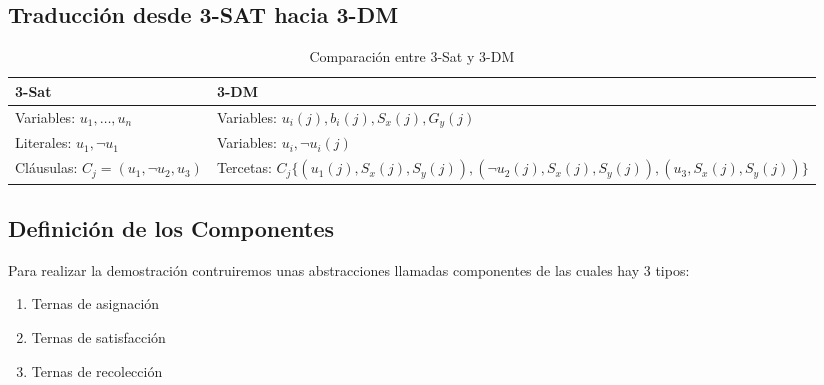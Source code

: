 \documentclass{article}
\begin{document}
\subsection{Traducción desde 3-SAT hacia 3-DM}

\begin{table}[h!]
    \centering
    \begin{tabularx}{\textwidth}{|X|X|}
        \hline
        \textbf{3-Sat} & \textbf{3-DM} \\
        \hline
        Variables: $u_1, \ldots, u_n$ & Variables: $u_i(j), b_i(j), S_x(j), G_y(j)$ \\
        \hline
        Literales: $u_1, \lnot u_1$ & Variables: $u_i, \lnot u_{i}(j)$ \\
        \hline
        Cláusulas: $C_{j}=(u_1,\lnot u_2,u_3)$ & Tercetas: $C_{j}\{\left(u_1(j), S_{x}(j), S_{y}(j)\right), \left(\lnot u_2(j), S_{x}(j), S_{y}(j)\right), \left(u_3, S_{x}(j), S_{y}(j)\right)\}$ \\
        \hline
    \end{tabularx}
    \caption{Comparación entre 3-Sat y 3-DM}
\end{table}

\subsection{Definición de los Componentes}
Para realizar la demostración contruiremos unas abstracciones llamadas componentes de las cuales hay 3 tipos:
\begin{enumerate}
    \item Ternas de asignación
    \item Ternas de satisfacción
    \item Ternas de recolección
    
\end{enumerate}
\end{document}
